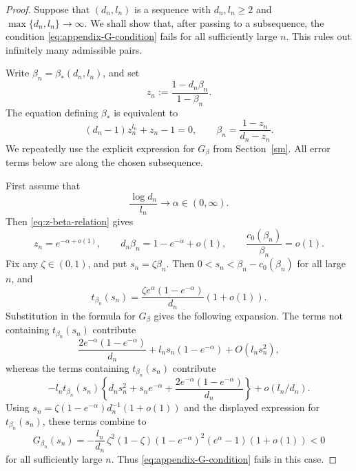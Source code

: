 \documentclass[11pt]{amsart}
\theoremstyle{plain}
\numberwithin{equation}{section}
\numberwithin{theorem}{section}
\numberwithin{figure}{section}
\begin{document}
\begin{proof}
Suppose that \((d_n,l_n)\) is a sequence with \(d_n,l_n\ge2\) and
\(\max\{d_n,l_n\}\to\infty\).  We shall show that, after passing to a subsequence, the
condition \eqref{eq:appendix-G-condition} fails for all sufficiently large \(n\).  This rules
out infinitely many admissible pairs.

Write \(\beta_n=\beta_*(d_n,l_n)\), and set
\[
  z_n:=\frac{1-d_n\beta_n}{1-\beta_n}.
\]
The equation defining \(\beta_*\) is equivalent to
\begin{equation}
  (d_n-1)z_n^{l_n}+z_n-1=0,
  \qquad
  \beta_n=\frac{1-z_n}{d_n-z_n}.
\label{eq:z-beta-relation}
\end{equation}
We repeatedly use the explicit expression for \(G_\beta\) from Section~\ref{sm}.  All
error terms below are along the chosen subsequence.

First assume that
\[
  \frac{\log d_n}{l_n}\longrightarrow \alpha\in(0,\infty).
\]
Then \eqref{eq:z-beta-relation} gives
\[
  z_n=e^{-\alpha+o(1)},
  \qquad
  d_n\beta_n=1-e^{-\alpha}+o(1),
  \qquad
  \frac{c_0(\beta_n)}{\beta_n}=o(1).
\]
Fix any \(\zeta\in(0,1)\), and put \(s_n=\zeta\beta_n\).  Then
\(0<s_n<\beta_n-c_0(\beta_n)\) for all large \(n\), and
\[
  t_{\beta_n}(s_n)=\frac{\zeta e^\alpha(1-e^{-\alpha})}{d_n}(1+o(1)).
\]
Substitution in the formula for \(G_\beta\) gives the following expansion.  The
terms not containing \(t_{\beta_n}(s_n)\) contribute
\[
  \frac{2e^{-\alpha}(1-e^{-\alpha})}{d_n}+l_n s_n(1-e^{-\alpha})+O(l_ns_n^2),
\]
whereas the terms containing \(t_{\beta_n}(s_n)\) contribute
\[
  -l_n t_{\beta_n}(s_n)
  \left\{d_ns_n^2+s_ne^{-\alpha}+\frac{2e^{-\alpha}(1-e^{-\alpha})}{d_n}
\right\}
  +o(l_n/d_n).
\]
Using \(s_n=\zeta(1-e^{-\alpha})d_n^{-1}(1+o(1))\) and the displayed expression for
\(t_{\beta_n}(s_n)\), these terms combine to
\begin{equation}
  G_{\beta_n}(s_n)
  =-\frac{l_n}{d_n}\,
  \zeta^2(1-\zeta)(1-e^{-\alpha})^2(e^\alpha-1)(1+o(1))<0
\label{eq:G-alpha-finite}
\end{equation}
for all sufficiently large \(n\).  Thus \eqref{eq:appendix-G-condition} fails in this case.


\end{proof}
\end{document}
